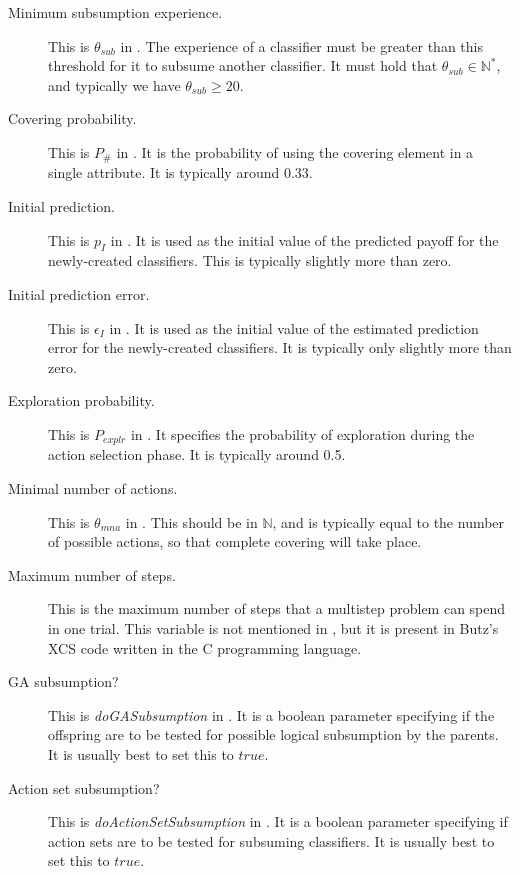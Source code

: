 \begin{description}
\item [Minimum subsumption experience.]
This is $\theta_{sub}$ in \cite{ButzWilson}.
The experience of a classifier must be greater than this threshold for it to subsume another classifier.
It must hold that $\theta_{sub} \in \mathbb{N^*}$, and typically we have $\theta_{sub} \ge 20$.
\item [Covering probability.]
\label{sec:covering-probability}
This is $P_\#$ in \cite{ButzWilson}.
It is the probability of using the covering element in a single attribute.
It is typically around 0.33.
\item [Initial prediction.]
This is $p_I$ in \cite{ButzWilson}.
It is used as the initial value of the predicted payoff for the newly-created classifiers.
This is typically slightly more than zero.
\item [Initial prediction error.]
This is $\epsilon_I$ in \cite{ButzWilson}.
It is used as the initial value of the estimated prediction error for the newly-created classifiers.
It is typically only slightly more than zero.
\item [Exploration probability.]
\label{sec:exploration-probability}
This is $P_{explr}$ in \cite{ButzWilson}.
It specifies the probability of exploration during the action selection phase.
It is typically around 0.5.
\item [Minimal number of actions.]
This is $\theta_{mna}$ in \cite{ButzWilson}.
This should be in $\mathbb{N}$, and is typically equal to the number of possible actions, so that complete covering will take place.
\item [Maximum number of steps.]
This is the maximum number of steps that a multistep problem can spend in one trial.
This variable is not mentioned in \cite{ButzWilson}, but it is present in Butz's XCS code written in the C programming language.
\item [GA subsumption?]
This is \emph{doGASubsumption} in \cite{ButzWilson}.
It is a boolean parameter specifying if the offspring are to be tested for possible logical subsumption by the parents.
It is usually best to set this to $true$.
\item [Action set subsumption?]
This is \emph{doActionSetSubsumption} in \cite{ButzWilson}.
It is a boolean parameter specifying if action sets are to be tested for subsuming classifiers.
It is usually best to set this to $true$.
\end{description}

